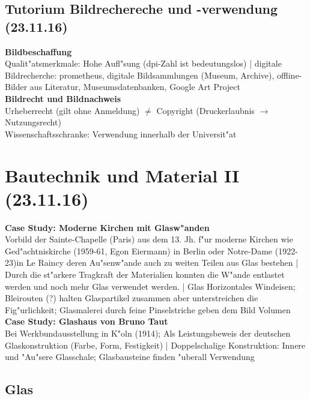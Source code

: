 \documentclass[emulatestandardclasses]{scrartcl}
\begin{document}
\subsection{Tutorium Bildrechereche und -verwendung (23.11.16)}

\textbf{Bildbeschaffung}\\
Qualit"atsmerkmale: Hohe Aufl"sung (dpi-Zahl ist bedeutungslos) | digitale Bildrecherche: prometheus, digitale Bildsammlungen (Museum, Archive), offline-Bilder aus Literatur, Museumsdatenbanken, Google Art Project\\

\noindent\textbf{Bildrecht und Bildnachweis}\\
Urheberrecht (gilt ohne Anmeldung) $\neq$ Copyright (Druckerlaubnis $\rightarrow$ Nutzungsrecht)\\
Wissenschaftsschranke: Verwendung innerhalb der Universit"at


\section{Bautechnik und Material II\\(23.11.16)}

\textbf{Case Study: Moderne Kirchen mit Glasw"anden}\\
Vorbild der Sainte-Chapelle (Paris) aus dem 13. Jh. f"ur moderne Kirchen wie Ged"achtniskirche (1959-61, Egon Eiermann) in Berlin oder Notre-Dame (1922-23)in Le Raincy deren Au"senw"ande auch zu weiten Teilen aus Glas bestehen | 
Durch die st"arkere Tragkraft der Materialien konnten die W"ande entlastet werden und noch mehr Glas verwendet werden. | Glas Horizontales Windeisen; Bleirouten (?) halten Glaspartikel zusammen aber unterstreichen die Fig"urlichkeit; Glasmalerei durch feine Pinselstriche geben dem Bild Volumen\\

\noindent\textbf{Case Study: Glashaus von Bruno Taut}\\
Bei Werkbundausstellung in K"oln (1914); Als Leistungsbeweis der deutschen Glaskonstruktion (Farbe, Form, Festigkeit) | Doppelschalige Konstruktion: Innere und "Au"sere Glasschale; Glasbausteine finden "uberall Verwendung

\subsection{Glas}
\end{document}
